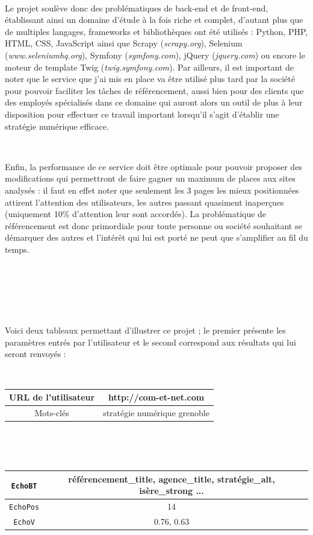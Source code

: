 \documentclass[12pt]{article}
\begin{document}
\

Le projet soulève donc des problématiques de back-end et de front-end, établissant ainsi un domaine d'étude à la fois riche et complet, d'autant plus que de multiples langages, frameworks et bibliothèques ont été utilisés : \textsf{Python}, \textsf{PHP}, \textsf{HTML}, \textsf{CSS}, \textsf{JavaScript} ainsi que \textsf{Scrapy} (\textit{scrapy.org}), \textsf{Selenium} (\textit{www.seleniumhq.org}), \textsf{Symfony} (\textit{symfony.com}), \textsf{jQuery} (\textit{jquery.com}) ou encore le moteur de template \textsf{Twig} (\textit{twig.symfony.com}). Par ailleurs, il est important de noter que le service que j'ai mis en place va être utilisé plus tard par la société pour pouvoir faciliter les tâches de référencement, aussi bien pour des clients que des employés spécialisés dans ce domaine qui auront alors un outil de plus à leur disposition pour effectuer ce travail important lorsqu'il s'agit d'établir une stratégie numérique efficace. 

\

Enfin, la performance de ce service doit être optimale pour pouvoir proposer des modifications qui permettront de faire gagner un maximum de places aux sites analysés : il faut en effet noter que seulement les 3 pages les mieux positionnées attirent l'attention des utilisateurs, les autres passant quasiment inaperçues (uniquement 10\% d'attention leur sont accordés). La problématique de référencement est donc primordiale pour toute personne ou société souhaitant se démarquer des autres et l'intérêt qui lui est porté ne peut que s'amplifier au fil du temps.

\

\

\

Voici deux tableaux permettant d'illustrer ce projet ; le premier présente les paramètres entrés par l'utilisateur et le second correspond aux résultats qui lui seront renvoyés :

\

\begin{center}
\begin{tabular}{|c|c|}
\hline
URL de l'utilisateur & http://com-et-net.com \\
\hline
Mots-clés & stratégie numérique grenoble \\
\hline
\end{tabular}

\

\

\begin{tabular}{|c|c|c|}
\hline
\texttt{EchoBT} & référencement\_title, agence\_title, stratégie\_alt, isère\_strong ... \\
\hline
\texttt{EchoPos} & 14 \\
\hline
\texttt{EchoV} & 0.76, 0.63 \\
\hline
\end{tabular}
\end{center}
\end{document}
